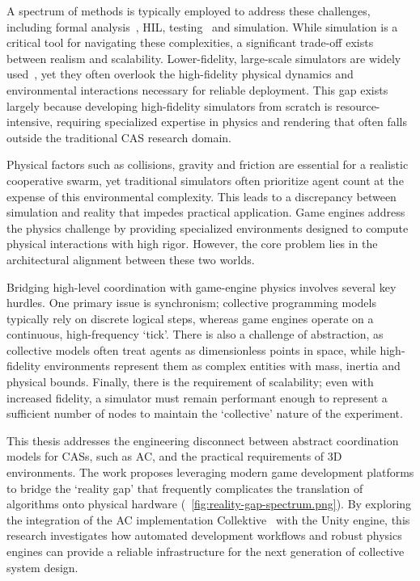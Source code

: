 A spectrum of methods is typically employed to address these challenges, including formal analysis~\cite{DBLP:journals/ras/KonurDF12}, \ac{HIL}, testing~\cite{Sende2024} and simulation. While simulation is a critical tool for navigating these complexities, a significant trade-off exists between realism and scalability. Lower-fidelity, large-scale simulators are widely used~\cite{DBLP:journals/computation/Calderon-ArceBS22}, yet they often overlook the high-fidelity physical dynamics and environmental interactions necessary for reliable deployment. This gap exists largely because developing high-fidelity simulators from scratch is resource-intensive, requiring specialized expertise in physics and rendering that often falls outside the traditional \ac{CAS} research domain.

Physical factors such as collisions, gravity and friction are essential for a realistic cooperative swarm, yet traditional simulators often prioritize agent count at the expense of this environmental complexity. This leads to a discrepancy between simulation and reality that impedes practical application. Game engines address the physics challenge by providing specialized environments designed to compute physical interactions with high rigor. However, the core problem lies in the architectural alignment between these two worlds.

Bridging high-level coordination with game-engine physics involves several key hurdles. One primary issue is synchronism; collective programming models typically rely on discrete logical steps, whereas game engines operate on a continuous, high-frequency `tick'. There is also a challenge of abstraction, as collective models often treat agents as dimensionless points in space, while high-fidelity environments represent them as complex entities with mass, inertia and physical bounds. Finally, there is the requirement of scalability; even with increased fidelity, a simulator must remain performant enough to represent a sufficient number of nodes to maintain the `collective' nature of the experiment.

This thesis addresses the engineering disconnect between abstract coordination models for \acp{CAS}, such as \ac{AC}, and the practical requirements of 3D environments. The work proposes leveraging modern game development platforms to bridge the `reality gap' that frequently complicates the translation of algorithms onto physical hardware (~\cref{fig:reality-gap-spectrum.png}). By exploring the integration of the \ac{AC} implementation Collektive~\cite{DBLP:conf/acsos/Cortecchia24} with the Unity engine, this research investigates how automated development workflows and robust physics engines can provide a reliable infrastructure for the next generation of collective system design.

